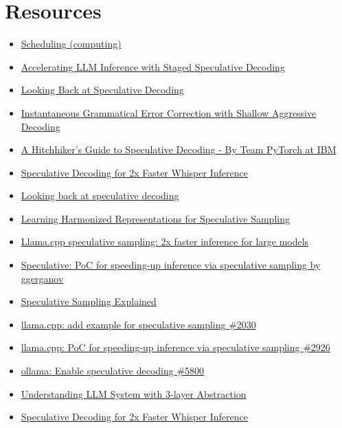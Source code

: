 \documentclass[a4paper,12pt]{report}
\begin{document}
\section*{Resources}
\begin{itemize}
    \item \href{https://arxiv.org/abs/2302.01318}{Scheduling (computing)}
    \item \href{https://arxiv.org/abs/2308.04623}{Accelerating LLM Inference with Staged Speculative Decoding}
    \item \href{https://news.ycombinator.com/item?id=43216518}{Looking Back at Speculative Decoding}
    \item \href{https://arxiv.org/abs/2106.04970}{Instantaneous Grammatical Error Correction with Shallow Aggressive Decoding}
    \item \href{https://pytorch.org/blog/hitchhikers-guide-speculative-decoding/}{A Hitchhiker’s Guide to Speculative Decoding - By Team PyTorch at IBM}
    \item \href{https://colab.research.google.com/github/sanchit-gandhi/notebooks/blob/main/speculative_decoding.ipynb#scrollTo=baf87589-b7fe-45dd-a6f6-9b9223581562}{Speculative Decoding for 2x Faster Whisper Inference}
    \item \href{https://research.google/blog/looking-back-at-speculative-decoding/}{Looking back at speculative decoding}
    \item \href{https://arxiv.org/abs/2408.15766}{Learning Harmonized Representations for Speculative Sampling}
    \item \href{https://news.ycombinator.com/item?id=37390024}{Llama.cpp speculative sampling: 2x faster inference for large models}
    \item \href{https://news.ycombinator.com/item?id=37357783}{Speculative: PoC for speeding-up inference via speculative sampling by ggerganov}
    \item \href{https://saibo-creator.github.io/post/2024_03_08_speculative_sampling/}{Speculative Sampling Explained}
    \item \href{https://github.com/ggml-org/llama.cpp/issues/2030}{llama.cpp: add example for speculative sampling \#2030}
    \item \href{https://github.com/ggml-org/llama.cpp/pull/2926}{llama.cpp: PoC for speeding-up inference via speculative sampling \#2926}
    \item \href{https://github.com/ollama/ollama/issues/5800}{ollama: Enable speculative decoding \#5800}
    \item \href{https://ralphmao.github.io/ML-software-system/}{Understanding LLM System with 3-layer Abstraction}
    \item \href{https://huggingface.co/blog/whisper-speculative-decoding}{Speculative Decoding for 2x Faster Whisper Inference}
\end{itemize}
\end{document}
